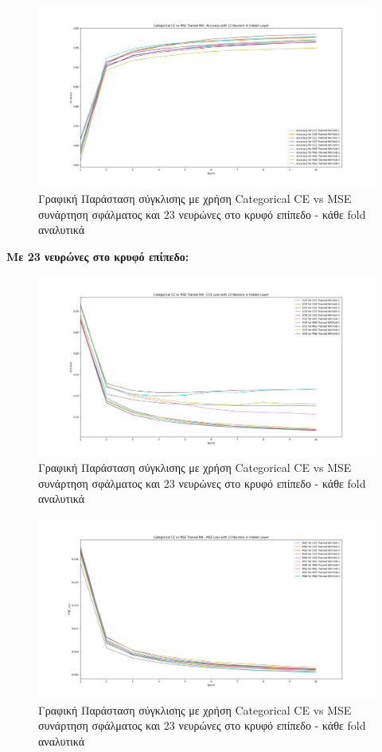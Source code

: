 \documentclass[12pt,a4paper]{article}
\begin{document}
\begin{figure}[H]
	\includegraphics[width=\textwidth]{6. CCE vs MSE - Accuracy - 12 Neurons.png}
	\caption{Γραφική Παράσταση σύγκλισης με χρήση Categorical CE vs MSE συνάρτηση σφάλματος και 23 νευρώνες στο κρυφό επίπεδο - κάθε fold αναλυτικά}
\end{figure}

\textbf{Με 23 νευρώνες στο κρυφό επίπεδο:}

\begin{figure}[H]
	\includegraphics[width=\textwidth]{7. CCE vs MSE - CCE Loss - 23 Neurons.png}
	\caption{Γραφική Παράσταση σύγκλισης με χρήση Categorical CE vs MSE συνάρτηση σφάλματος και 23 νευρώνες στο κρυφό επίπεδο - κάθε fold αναλυτικά}
\end{figure}

\begin{figure}[H]
	\includegraphics[width=\textwidth]{8. CCE vs MSE - MSE Loss - 23 Neurons.png}
	\caption{Γραφική Παράσταση σύγκλισης με χρήση Categorical CE vs MSE συνάρτηση σφάλματος και 23 νευρώνες στο κρυφό επίπεδο - κάθε fold αναλυτικά}
\end{figure}
\end{document}
